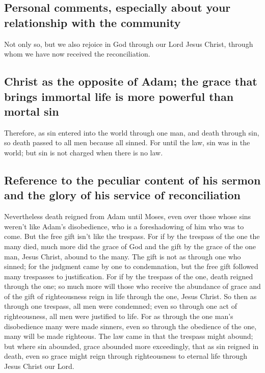 \hypertarget{personal-comments-especially-about-your-relationship-with-the-community}{%
\subsection{Personal comments, especially about your relationship with
the
community}\label{personal-comments-especially-about-your-relationship-with-the-community}}

 Not only so, but we also rejoice in God through our Lord
Jesus Christ, through whom we have now received the reconciliation.

\hypertarget{christ-as-the-opposite-of-adam-the-grace-that-brings-immortal-life-is-more-powerful-than-mortal-sin}{%
\subsection{Christ as the opposite of Adam; the grace that brings
immortal life is more powerful than mortal
sin}\label{christ-as-the-opposite-of-adam-the-grace-that-brings-immortal-life-is-more-powerful-than-mortal-sin}}

 Therefore, as sin entered into the world through one
man, and death through sin, so death passed to all men because all
sinned.  For until the law, sin was in the world; but sin
is not charged when there is no law.

\hypertarget{reference-to-the-peculiar-content-of-his-sermon-and-the-glory-of-his-service-of-reconciliation}{%
\subsection{Reference to the peculiar content of his sermon and the
glory of his service of
reconciliation}\label{reference-to-the-peculiar-content-of-his-sermon-and-the-glory-of-his-service-of-reconciliation}}

 Nevertheless death reigned from Adam until Moses, even
over those whose sins weren't like Adam's disobedience, who is a
foreshadowing of him who was to come.  But the free gift
isn't like the trespass. For if by the trespass of the one the many
died, much more did the grace of God and the gift by the grace of the
one man, Jesus Christ, abound to the many.  The gift is
not as through one who sinned; for the judgment came by one to
condemnation, but the free gift followed many trespasses to
justification.  For if by the trespass of the one, death
reigned through the one; so much more will those who receive the
abundance of grace and of the gift of righteousness reign in life
through the one, Jesus Christ.  So then as through one
trespass, all men were condemned; even so through one act of
righteousness, all men were justified to life.  For as
through the one man's disobedience many were made sinners, even so
through the obedience of the one, many will be made righteous.
 The law came in that the trespass might abound; but
where sin abounded, grace abounded more exceedingly, 
that as sin reigned in death, even so grace might reign through
righteousness to eternal life through Jesus Christ our Lord.

